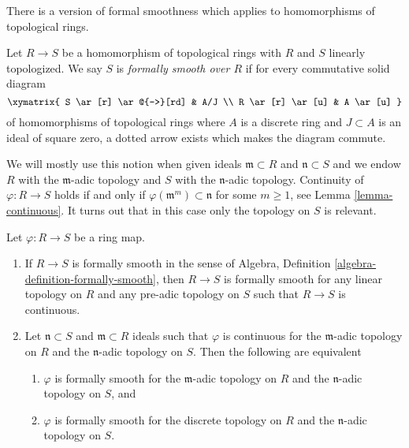 \noindent
There is a version of formal smoothness which applies to
homomorphisms of topological rings.

\begin{definition}
\label{definition-formally-smooth}
Let $R \to S$ be a homomorphism of topological rings with $R$ and $S$
linearly topologized. We say $S$ is {\it formally smooth over $R$} if
for every commutative solid diagram
$$
\xymatrix{
S \ar[r] \ar@{-->}[rd] & A/J \\
R \ar[r] \ar[u] & A \ar[u]
}
$$
of homomorphisms of topological rings where $A$ is a discrete ring and
$J \subset A$ is an ideal of square zero, a dotted arrow exists which
makes the diagram commute.
\end{definition}

\noindent
We will mostly use this notion when given ideals $\mathfrak m \subset R$
and $\mathfrak n \subset S$ and we endow $R$ with the $\mathfrak m$-adic
topology and $S$ with the $\mathfrak n$-adic topology. Continuity of
$\varphi : R \to S$ holds if and only if
$\varphi(\mathfrak m^m) \subset  \mathfrak n$ for some $m \geq 1$, see
Lemma \ref{lemma-continuous}. It turns out that
in this case only the topology on $S$ is relevant.

\begin{lemma}
\label{lemma-formally-smooth}
Let $\varphi : R \to S$ be a ring map.
\begin{enumerate}
\item If $R \to S$ is formally smooth in
the sense of Algebra, Definition \ref{algebra-definition-formally-smooth},
then $R \to S$ is formally smooth for any linear topology on $R$ and
any pre-adic topology on $S$ such that $R \to S$ is continuous.
\item Let $\mathfrak n \subset S$ and $\mathfrak m \subset R$
ideals such that $\varphi$ is continuous for the $\mathfrak m$-adic
topology on $R$ and the $\mathfrak n$-adic topology
on $S$. Then the following are equivalent
\begin{enumerate}
\item $\varphi$ is formally smooth for the $\mathfrak m$-adic topology on
$R$ and the $\mathfrak n$-adic topology on $S$, and
\item $\varphi$ is formally smooth for the discrete topology
on $R$ and the $\mathfrak n$-adic topology on $S$.
\end{enumerate}
\end{enumerate}
\end{lemma}

